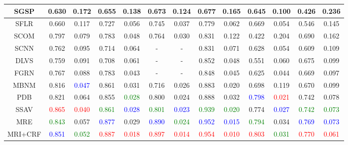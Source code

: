 \begin{table}[]
\begin{tabular}{|c|c|c|c|c|c|c|c|c|c|c|c|c|}
SGSP & 0.630 & 0.172 & 0.655 & 0.138 & 0.673 & 0.124 & 0.677 & 0.165 & 0.645 & 0.100 & 0.426 & 0.236 \\ \hline
SFLR & 0.660 & 0.117 & 0.727 & 0.056 & 0.745 & 0.037 & 0.779 & 0.062 & 0.669 & 0.054 & 0.546 & 0.145 \\ \hline
SCOM & 0.797 & 0.079 & 0.783 & 0.048 & 0.764 & 0.030 & 0.831 & 0.122 & 0.422 & 0.204 & 0.690 & 0.162 \\ \hline
SCNN & 0.762 & 0.095 & 0.714 & 0.064 & - & - & 0.831 & 0.071 & 0.628 & 0.054 & 0.609 & 0.109 \\ \hline
DLVS & 0.759 & 0.091 & 0.708 & 0.061 & - & - & 0.852 & 0.048 & 0.551 & 0.060 & 0.675 & 0.099 \\ \hline
FGRN & 0.767 & 0.088 & 0.783 & 0.043 & - & - & 0.848 & 0.045 & 0.625 & 0.044 & 0.669 & 0.097 \\ \hline
MBNM & 0.816 & \textcolor{blue}{0.047} & 0.861 & 0.031 & 0.716 & 0.026 & 0.883 & 0.020 & 0.698 & 0.119 & 0.670 & 0.099 \\ \hline
PDB & 0.821 & 0.064 & 0.855 & \textcolor{green}{0.028} & 0.800 & 0.024 & 0.888 & 0.032 & \textcolor{blue}{0.798} & \textcolor{red}{0.021} & 0.742 & 0.078 \\ \hline
SSAV & \textcolor{red}{0.865} & \textcolor{red}{0.040} & \textcolor{green}{0.861} & \textcolor{blue}{0.028} & \textcolor{green}{0.801} & \textcolor{blue}{0.023} & \textcolor{green}{0.939} & \textcolor{green}{0.020} & 0.774 & \textcolor{blue}{0.027} & \textcolor{green}{0.742} & \textcolor{green}{0.073} \\ \hline \hline
MRE & \textcolor{green}{0.843} & 0.057 & \textcolor{blue}{0.877} & 0.029 & \textcolor{blue}{0.890} & \textcolor{green}{0.024} & \textcolor{blue}{0.952} & \textcolor{blue}{0.015} & \textcolor{green}{0.794} & 0.034 & \textcolor{blue}{0.769} & \textcolor{blue}{0.073} \\ \hline
MRI+CRF & \textcolor{blue}{0.851} & \textcolor{green}{0.052} & \textcolor{red}{0.887} & \textcolor{red}{0.018} & \textcolor{red}{0.897} & \textcolor{red}{0.014} & \textcolor{red}{0.954} & \textcolor{red}{0.010} & \textcolor{red}{0.803} & \textcolor{green}{0.031} & \textcolor{red}{0.770} & \textcolor{red}{0.061} \\ \hline
\end{tabular}
\end{table}
